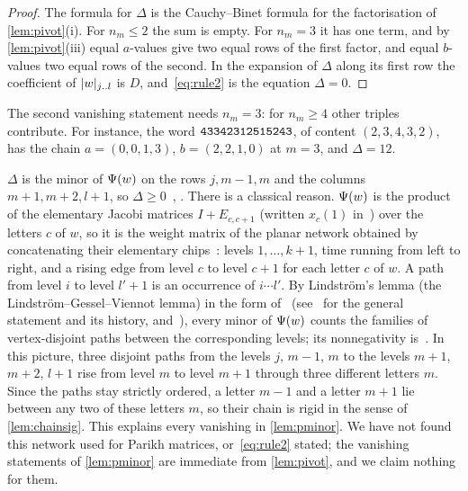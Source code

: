 \documentclass[11pt,a4paper]{article}
\begin{document}
\begin{proof}
The formula for $\Delta$ is the Cauchy--Binet formula for the factorisation of \cref{lem:pivot}(i). For $n_m\le2$ the sum is empty. For $n_m=3$ it has one term, and by \cref{lem:pivot}(iii) equal $a$-values give two equal rows of the first factor, and equal $b$-values two equal rows of the second. In the expansion of $\Delta$ along its first row the coefficient of $\lvert w\rvert_{j\mathinner{\ldotp\ldotp} l}$ is $D$, and~\eqref{eq:rule2} is the equation $\Delta=0$.
\end{proof}

The second vanishing statement needs $n_m=3$: for $n_m\ge4$ other triples contribute. For instance, the word $\mathtt{43342312515243}$, of content $(2,3,4,3,2)$, has the chain $a=(0,0,1,3)$, $b=(2,2,1,0)$ at $m=3$, and $\Delta=12$.

\begin{remark}\label{rem:network}
$\Delta$ is the minor of $\Psi(w)$ on the rows $j,m-1,m$ and the columns $m+1,m+2,l+1$, so $\Delta\ge0$~\cite[Theorem~6, p.~12]{MSY04}, \cite[Theorem~6, p.~196]{Sal05}. There is a classical reason. $\Psi(w)$ is the product of the elementary Jacobi matrices $I+E_{c,c+1}$ (written $x_c(1)$ in~\cite[p.~6]{FZ00}) over the letters $c$ of $w$, so it is the weight matrix of the planar network obtained by concatenating their elementary chips~\cite[p.~7]{FZ00}: levels $1,\dots,k+1$, time running from left to right, and a rising edge from level $c$ to level $c+1$ for each letter $c$ of $w$. A path from level $i$ to level $l'+1$ is an occurrence of $i\cdots l'$. By Lindstr\"om's lemma (the Lindstr\"om--Gessel--Viennot lemma) in the form of~\cite[Lemma~1, p.~2]{FZ00} (see~\cite[Section~10.13, Theorem~10.13.1 and Corollary~10.13.2]{Kra15} for the general statement and its history, and~\cite{GV85}), every minor of $\Psi(w)$ counts the families of vertex-disjoint paths between the corresponding levels; its nonnegativity is~\cite[Corollary~2, p.~3]{FZ00}. In this picture, three disjoint paths from the levels $j$, $m-1$, $m$ to the levels $m+1$, $m+2$, $l+1$ rise from level $m$ to level $m+1$ through three different letters $m$. Since the paths stay strictly ordered, a letter $m-1$ and a letter $m+1$ lie between any two of these letters $m$, so their chain is rigid in the sense of \cref{lem:chainsig}. This explains every vanishing in \cref{lem:pminor}. We have not found this network used for Parikh matrices, or~\eqref{eq:rule2} stated; the vanishing statements of \cref{lem:pminor} are immediate from \cref{lem:pivot}, and we claim nothing for them.
\end{remark}
\end{document}
